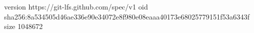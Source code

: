 version https://git-lfs.github.com/spec/v1
oid sha256:8a534505d46ae336e90e34072e8f980e08eaaa40173e68025779151f53a6343f
size 1048672

